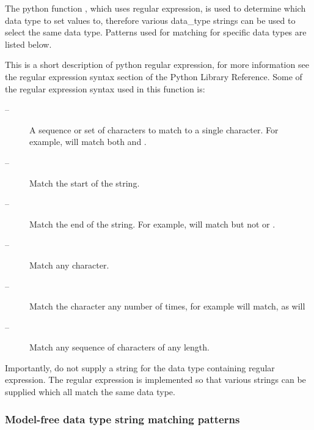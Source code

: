 The python  function 
, which uses regular expression,  is used to determine which data
type to set values to, therefore various data\_type strings can be used to select the same
data type.  Patterns used for matching for specific data types are listed below.

This is a short description of python  regular expression,  for more information see the
regular expression  syntax section of the Python  Library Reference.  Some of the regular
expression syntax used in this function is:

\begin{description}
\item[    
 --]   A sequence  or set of characters to match to a single character.  For example, 
 will match both 
 and 
. 
\item[    
 --]   Match the start of the string. 
\item[    
 --]   Match the end of the string.  For example, 
 will match 
 but not 
 or 
. 
\item[    
 --]   Match any character. 
\item[    
 --]   Match the character 
 any number of times, for example 
 will match, as will 
 
\item[    
 --]   Match any sequence  of characters of any length. 
\end{description}
Importantly, do not supply a string for the data type containing regular expression.   The
regular expression  is implemented so that various strings can be supplied which all match
the same data type.


\subsubsection{Model-free data type string matching patterns}



